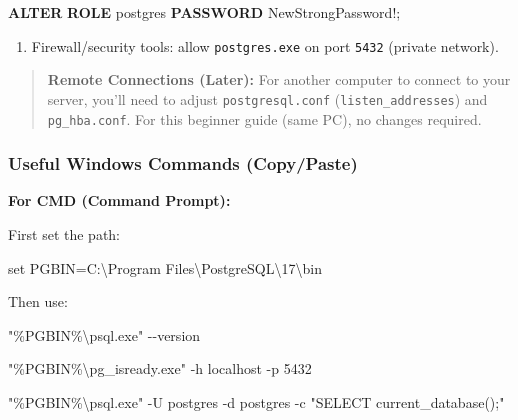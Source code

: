\documentclass[
  letterpaper,
  DIV=11,
  numbers=noendperiod]{scrartcl}
\newenvironment{Shaded}{\begin{snugshade}}{\end{snugshade}}
\newcommand{\AttributeTok}[1]{\textcolor[rgb]{0.40,0.45,0.13}{#1}}
\newcommand{\BuiltInTok}[1]{\textcolor[rgb]{0.00,0.23,0.31}{#1}}
\newcommand{\KeywordTok}[1]{\textcolor[rgb]{0.00,0.23,0.31}{\textbf{#1}}}
\newcommand{\NormalTok}[1]{\textcolor[rgb]{0.00,0.23,0.31}{#1}}
\newcommand{\PreprocessorTok}[1]{\textcolor[rgb]{0.68,0.00,0.00}{#1}}
\newcommand{\StringTok}[1]{\textcolor[rgb]{0.13,0.47,0.30}{#1}}
\newcommand{\VariableTok}[1]{\textcolor[rgb]{0.07,0.07,0.07}{#1}}
\providecommand{\tightlist}{%
  \setlength{\itemsep}{0pt}\setlength{\parskip}{0pt}}\usepackage{longtable,booktabs,array}
\begin{document}
\begin{Shaded}
\begin{Highlighting}[]
\KeywordTok{ALTER} \KeywordTok{ROLE}\NormalTok{ postgres }\KeywordTok{PASSWORD} \StringTok{\textquotesingle{}NewStrongPassword!\textquotesingle{}}\NormalTok{;}
\end{Highlighting}
\end{Shaded}

\begin{enumerate}
\def\labelenumi{\arabic{enumi}.}
\setcounter{enumi}{6}
\tightlist
\item
  Firewall/security tools: allow \texttt{postgres.exe} on port
  \texttt{5432} (private network).
\end{enumerate}

\begin{quote}
\textbf{Remote Connections (Later):} For another computer to connect to
your server, you'll need to adjust \texttt{postgresql.conf}
(\texttt{listen\_addresses}) and \texttt{pg\_hba.conf}. For this
beginner guide (same PC), no changes required.
\end{quote}

\subsubsection{Useful Windows Commands
(Copy/Paste)}\label{useful-windows-commands-copypaste}

\textbf{For CMD (Command Prompt):}

First set the path:

\begin{Shaded}
\begin{Highlighting}[]
\BuiltInTok{set} \VariableTok{PGBIN}\NormalTok{=C:\textbackslash{}Program Files\textbackslash{}PostgreSQL\textbackslash{}17\textbackslash{}bin}
\end{Highlighting}
\end{Shaded}

Then use:

\begin{Shaded}
\begin{Highlighting}[]
\StringTok{"}\PreprocessorTok{\%}\VariableTok{PGBIN}\PreprocessorTok{\%}\StringTok{\textbackslash{}psql.exe"}\NormalTok{ {-}{-}version}

\StringTok{"}\PreprocessorTok{\%}\VariableTok{PGBIN}\PreprocessorTok{\%}\StringTok{\textbackslash{}pg\_isready.exe"}\NormalTok{ {-}h localhost }\AttributeTok{{-}p}\NormalTok{ 5432}

\StringTok{"}\PreprocessorTok{\%}\VariableTok{PGBIN}\PreprocessorTok{\%}\StringTok{\textbackslash{}psql.exe"}\NormalTok{ {-}U postgres }\AttributeTok{{-}d}\NormalTok{ postgres }
\NormalTok{{-}c }\StringTok{"SELECT current\_database();"}
\end{Highlighting}
\end{Shaded}
\end{document}

